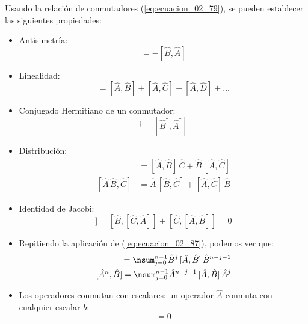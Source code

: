 Usando la relación de conmutadores (\ref{eq:ecuacion_02_79}), se pueden establecer las siguientes propiedades:
\begin{itemize}
\item Antisimetría:
\begin{equation}
[\hat{A}, \hat{B}] = - [\hat{B}, \hat{A}]
\label{eq:ecuacion_02_84}
\end{equation}
\item Linealidad:
\begin{equation}
[\hat{A} + \hat{B} + \hat{C} + \hat{D} + \ldots] = [\hat{A} , \hat{B}] + [\hat{A} , \hat{C}] + [\hat{A} , \hat{D}] + \ldots
\label{eq:ecuacion_02_85} 
\end{equation}
\item Conjugado Hermitiano de un conmutador:
\begin{equation}
[\hat{A}, \hat{B}]^{\dagger} = [\hat{B}^{\dagger}, \hat{A}^{\dagger}]
\label{eq:ecuacion_02_86}
\end{equation}
\item Distribución:
\begin{align}
[\hat{A},  \hat{B} \, \hat{C}] &= [\hat{A} , \hat{B}] \,  \hat{C} + \hat{B} \, [\hat{A} , \hat{C}]
\label{eq:ecuacion_02_87} \\[1em]
[\hat{A} \, \hat{B} , \hat{C}] &= \hat{A} \,[ \hat{B} ,  \hat{C}] + [\hat{A} , \hat{C}] \, \hat{B}
\label{eq:ecuacion_02_88}
\end{align}
\item Identidad de Jacobi:
\begin{equation}
[\hat{A},  [\hat{B} , \hat{C}]] = [\hat{B}, [\hat{C} , \hat{A}]] + [\hat{C},  [\hat{A} , \hat{B}]] = 0
\label{eq:ecuacion_02_89}
\end{equation}
\item Repitiendo la aplicación de (\ref{eq:ecuacion_02_87}), podemos ver que:
\begin{align}
[\hat{A},  \hat{B}^{n}] = \nsum_{j=0}^{n-1} \hat{B}^{j} \, [\hat{A},  \hat{B}] \, \hat{B}^{n-j-1} \label{eq:ecuacion_02_90} \\
[\hat{A}^{n},  \hat{B}] = \nsum_{j=0}^{n-1} \hat{A}^{n-j-1} \, [\hat{A},  \hat{B}] \, \hat{A}^{j} \label{eq:ecuacion_02_91}
\end{align}
\item Los operadores conmutan con escalares: un operador $\hat{A}$ conmuta con cualquier escalar $b$:
\begin{equation}
[ \hat{A}, b ] = 0
\label{eq:ecuacion_02_92}
\end{equation}
\end{itemize}

